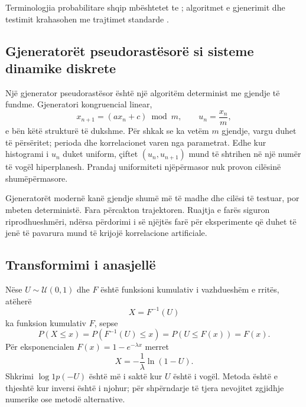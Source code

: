 \documentclass[11pt,oneside,openany]{book}
\begin{document}
Terminologjia probabilitare shqip mbështetet te \cite{capollari,butka,tasho}; algoritmet e gjenerimit dhe testimit krahasohen me trajtimet standarde \cite{press,robert}.



\subsection{Gjeneratorët pseudorastësorë si sisteme dinamike diskrete}
Një gjenerator pseudorastësor është një algoritëm determinist me gjendje të fundme. Gjeneratori kongruencial linear,
\begin{equation}
 x_{n+1}=(ax_n+c)\bmod m,
 \qquad u_n=\frac{x_n}{m},
\end{equation}
e bën këtë strukturë të dukshme. Për shkak se ka vetëm $m$ gjendje, vargu duhet të përsëritet; perioda dhe korrelacionet varen nga parametrat. Edhe kur histogrami i $u_n$ duket uniform, çiftet $(u_n,u_{n+1})$ mund të shtrihen në një numër të vogël hiperplanesh. Prandaj uniformiteti njëpërmasor nuk provon cilësinë shumëpërmasore.

Gjeneratorët modernë kanë gjendje shumë më të madhe dhe cilësi të testuar, por mbeten deterministë. Fara përcakton trajektoren. Ruajtja e farës siguron riprodhueshmëri, ndërsa përdorimi i së njëjtës farë për eksperimente që duhet të jenë të pavarura mund të krijojë korrelacione artificiale.

\subsection{Transformimi i anasjellë}
Nëse $U\sim\mathcal U(0,1)$ dhe $F$ është funksioni kumulativ i vazhdueshëm e rritës, atëherë
\begin{equation}
 X=F^{-1}(U)
\end{equation}
ka funksion kumulativ $F$, sepse
\begin{equation}
 P(X\le x)=P(F^{-1}(U)\le x)=P(U\le F(x))=F(x).
\end{equation}
Për eksponencialen $F(x)=1-e^{-\lambda x}$ merret
\begin{equation}
 X=-\frac{1}{\lambda}\ln(1-U).
\end{equation}
Shkrimi $\log1p(-U)$ është më i saktë kur $U$ është i vogël. Metoda është e thjeshtë kur inversi është i njohur; për shpërndarje të tjera nevojitet zgjidhje numerike ose metodë alternative.
\end{document}
